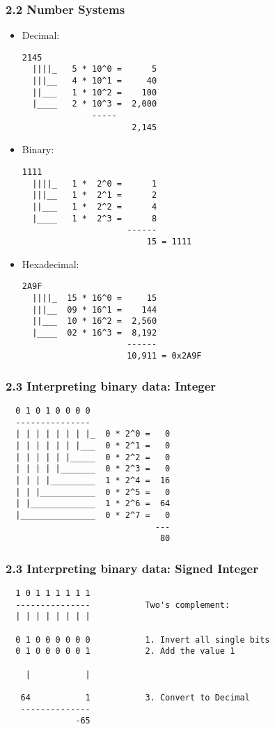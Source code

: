\begin{frame}[fragile]
  \frametitle{2.2 Number Systems}
    \begin{itemize}
        \item Decimal:
  \begin{lstlisting}[basicstyle=\tiny]
  2145
  ||||_   5 * 10^0 =      5
  |||__   4 * 10^1 =     40
  ||___   1 * 10^2 =    100
  |____   2 * 10^3 =  2,000
		      -----
                      2,145
  \end{lstlisting}
        \item Binary:
  \begin{lstlisting}[basicstyle=\tiny]
  1111
  ||||_   1 *  2^0 =      1
  |||__   1 *  2^1 =      2
  ||___   1 *  2^2 =      4
  |____   1 *  2^3 =      8
                     ------
                         15 = 1111
  \end{lstlisting}
        \item Hexadecimal:
  \begin{lstlisting}[basicstyle=\tiny]
  2A9F
  ||||_  15 * 16^0 =     15
  |||__  09 * 16^1 =    144
  ||___  10 * 16^2 =  2,560
  |____  02 * 16^3 =  8,192
                     ------
                     10,911 = 0x2A9F
  \end{lstlisting}
    \end{itemize}
\end{frame}


\begin{frame}[fragile]
  \frametitle{2.3 Interpreting binary data: Integer}
  \begin{verbatim}
  0 1 0 1 0 0 0 0
  ---------------
  | | | | | | | |_  0 * 2^0 =   0
  | | | | | | |___  0 * 2^1 =   0
  | | | | | |_____  0 * 2^2 =   0
  | | | | |_______  0 * 2^3 =   0
  | | | |_________  1 * 2^4 =  16
  | | |___________  0 * 2^5 =   0
  | |_____________  1 * 2^6 =  64
  |_______________  0 * 2^7 =   0
                              ---
                               80
  \end{verbatim}
\end{frame}


\begin{frame}[fragile]
  \frametitle{2.3 Interpreting binary data: Signed Integer}
  \begin{verbatim}
  1 0 1 1 1 1 1 1
  ---------------           Two's complement:
  | | | | | | | |

  0 1 0 0 0 0 0 0           1. Invert all single bits
  0 1 0 0 0 0 0 1           2. Add the value 1

    |           |

   64           1           3. Convert to Decimal
   --------------
              -65
  \end{verbatim}
\end{frame}


